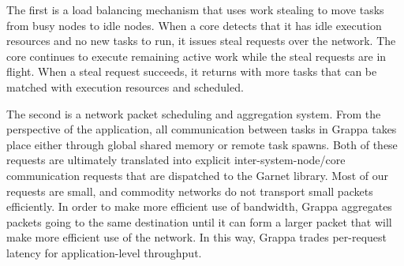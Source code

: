 The first is a load balancing mechanism that uses work stealing to
move tasks from busy nodes to idle nodes. When a core detects that it
has idle execution resources and no new tasks to run, it issues steal
requests over the network. The core continues to execute remaining
active work while the steal requests are in flight. When a steal
request succeeds, it returns with more tasks that can be matched with
execution resources and scheduled.

The second is a network packet scheduling and aggregation system. From
the perspective of the application, all communication between tasks in
Grappa takes place either through global shared memory or remote task
spawns. Both of these requests are ultimately translated into explicit
inter-system-node/core communication requests that are dispatched to
the Garnet library. Most of our requests are small, and commodity
networks do not transport small packets efficiently. In order to make
more efficient use of bandwidth, Grappa aggregates packets going to the
same destination until it can form a larger packet that will make more
efficient use of the network. In this way, Grappa trades per-request
latency for application-level throughput.
